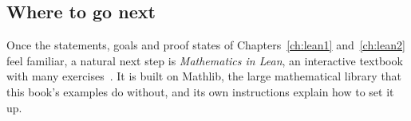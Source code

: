 \subsection*{Where to go next}
Once the statements, goals and proof states of Chapters~\ref{ch:lean1} and~\ref{ch:lean2} feel familiar, a natural next step is \emph{Mathematics in Lean}, an interactive textbook with many exercises~\cite{mil}. It is built on Mathlib, the large mathematical library that this book's examples do without, and its own instructions explain how to set it up.
